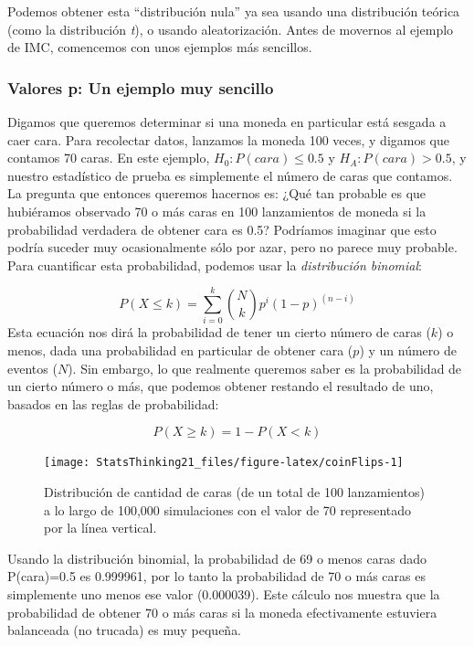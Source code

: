 \documentclass[
  12pt,
]{book}
\begin{document}
Podemos obtener esta ``distribución nula'' ya sea usando una distribución teórica (como la distribución \emph{t}), o usando aleatorización. Antes de movernos al ejemplo de IMC, comencemos con unos ejemplos más sencillos.

\hypertarget{pvalues-very-simple}{%
\subsubsection{Valores p: Un ejemplo muy sencillo}\label{pvalues-very-simple}}

Digamos que queremos determinar si una moneda en particular está sesgada a caer cara. Para recolectar datos, lanzamos la moneda 100 veces, y digamos que contamos 70 caras. En este ejemplo, \(H_0: P(cara) \le 0.5\) y \(H_A: P(cara) > 0.5\), y nuestro estadístico de prueba es simplemente el número de caras que contamos. La pregunta que entonces queremos hacernos es: ¿Qué tan probable es que hubiéramos observado 70 o más caras en 100 lanzamientos de moneda si la probabilidad verdadera de obtener cara es 0.5? Podríamos imaginar que esto podría suceder muy ocasionalmente sólo por azar, pero no parece muy probable. Para cuantificar esta probabilidad, podemos usar la \emph{distribución binomial}:

\[
P(X \le k) = \sum_{i=0}^k \binom{N}{k} p^i (1-p)^{(n-i)}
\]
Esta ecuación nos dirá la probabilidad de tener un cierto número de caras (\(k\)) o menos, dada una probabilidad en particular de obtener cara (\(p\)) y un número de eventos (\(N\)). Sin embargo, lo que realmente queremos saber es la probabilidad de un cierto número o más, que podemos obtener restando el resultado de uno, basados en las reglas de probabilidad:

\[
P(X \ge k) = 1 - P(X < k)
\]

\begin{figure}
\texttt{[image: StatsThinking21\_files/figure-latex/coinFlips-1]} \caption{Distribución de cantidad de caras (de un total de 100 lanzamientos) a lo largo de 100,000 simulaciones con el valor de 70 representado por la línea vertical.}\label{fig:coinFlips}
\end{figure}

Usando la distribución binomial, la probabilidad de 69 o menos caras dado P(cara)=0.5 es 0.999961, por lo tanto la probabilidad de 70 o más caras es simplemente uno menos ese valor (0.000039).
Este cálculo nos muestra que la probabilidad de obtener 70 o más caras si la moneda efectivamente estuviera balanceada (no trucada) es muy pequeña.
\end{document}
